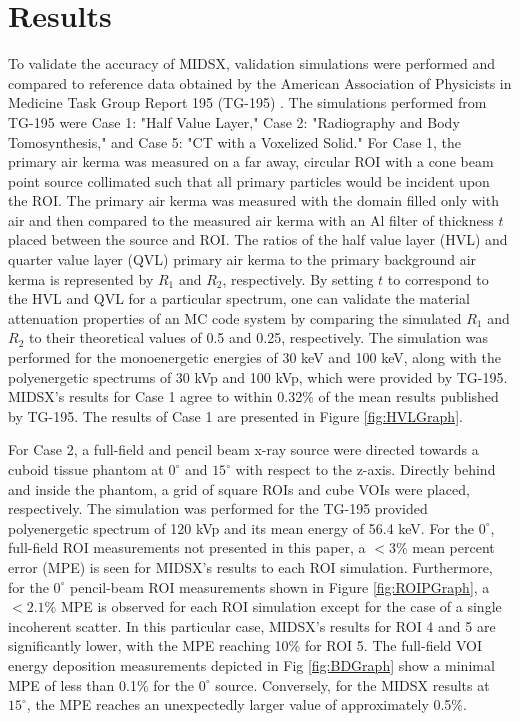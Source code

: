 \section{Results}
\par To validate the accuracy of MIDSX, validation simulations were performed and compared to reference data obtained by the American Association of Physicists in Medicine Task Group Report 195 (TG-195) \cite{sechopoulos_monte_2015}. The simulations performed from TG-195 were Case 1: "Half Value Layer," Case 2: "Radiography and Body Tomosynthesis," and Case 5: "CT with a Voxelized Solid." For Case 1, the primary air kerma was measured on a far away, circular ROI with a cone beam point source collimated such that all primary particles would be incident upon the ROI. The primary air kerma was measured with the domain filled only with air and then compared to the measured air kerma with an Al filter of thickness $t$ placed between the source and ROI. The ratios of the half value layer (HVL) and quarter value layer (QVL) primary air kerma to the primary background air kerma is represented by $R_1$ and $R_2$, respectively. By setting $t$ to correspond to the HVL and QVL for a particular spectrum, one can validate the material attenuation properties of an MC code system by comparing the simulated $R_1$ and $R_2$ to their theoretical values of 0.5 and 0.25, respectively. The simulation was performed for the monoenergetic energies of 30 keV and 100 keV, along with the polyenergetic spectrums of 30 kVp and 100 kVp, which were provided by TG-195. MIDSX's results for Case 1 agree to within 0.32\% of the mean results published by TG-195. The results of Case 1 are presented in Figure \ref{fig:HVLGraph}.
\par For Case 2, a full-field and pencil beam x-ray source were directed towards a cuboid tissue phantom at $0^\circ$ and $15^\circ$ with respect to the z-axis. Directly behind and inside the phantom, a grid of square ROIs and cube VOIs were placed, respectively. The simulation was performed for the TG-195 provided polyenergetic spectrum of 120 kVp and its mean energy of 56.4 keV. For the $0^\circ$, full-field ROI measurements not presented in this paper, a $<3$\% mean percent error (MPE) is seen for MIDSX's results to each ROI simulation. Furthermore, for the $0^\circ$ pencil-beam ROI measurements shown in Figure \ref{fig:ROIPGraph}, a $<2.1$\% MPE is observed for each ROI simulation except for the case of a single incoherent scatter. In this particular case, MIDSX's results for ROI 4 and 5 are significantly lower, with the MPE reaching 10\% for ROI 5. The full-field VOI energy deposition measurements depicted in Fig \ref{fig:BDGraph} show a minimal MPE of less than 0.1\% for the $0^\circ$ source. Conversely, for the MIDSX results at $15^\circ$, the MPE reaches an unexpectedly larger value of approximately 0.5\%.
